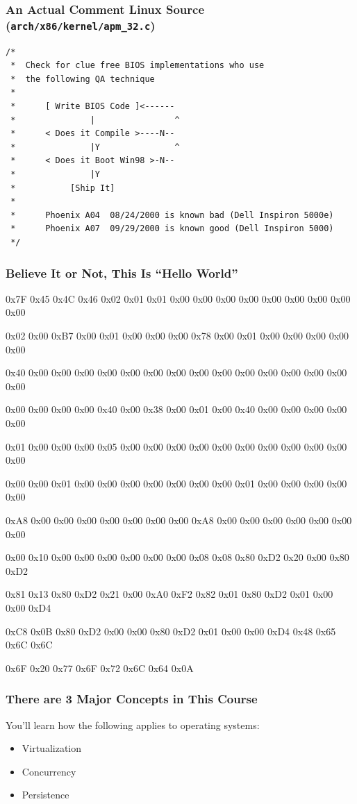   \begin{frame}[fragile]
    \frametitle{An Actual Comment Linux Source (\texttt{arch/x86/kernel/apm\_32.c})}
    \begin{lstlisting}
/*
 *  Check for clue free BIOS implementations who use
 *  the following QA technique
 *
 *      [ Write BIOS Code ]<------
 *               |                ^
 *      < Does it Compile >----N--
 *               |Y               ^
 *      < Does it Boot Win98 >-N--
 *               |Y
 *           [Ship It]
 *
 *      Phoenix A04  08/24/2000 is known bad (Dell Inspiron 5000e)
 *      Phoenix A07  09/29/2000 is known good (Dell Inspiron 5000)
 */
    \end{lstlisting}
  \end{frame}

  \begin{frame}
    \frametitle{Believe It or Not, This Is ``Hello World''}

    \scriptsize \ttfamily
    0x7F 0x45 0x4C 0x46 0x02 0x01 0x01 0x00 0x00 0x00 0x00 0x00 0x00 0x00 0x00
    0x00
    
    0x02 0x00 0xB7 0x00 0x01 0x00 0x00 0x00 0x78 0x00 0x01 0x00 0x00 0x00 0x00
    0x00
    
    0x40 0x00 0x00 0x00 0x00 0x00 0x00 0x00 0x00 0x00 0x00 0x00 0x00 0x00 0x00
    0x00
    
    0x00 0x00 0x00 0x00 0x40 0x00 0x38 0x00 0x01 0x00 0x40 0x00 0x00 0x00 0x00
    0x00
    
    0x01 0x00 0x00 0x00 0x05 0x00 0x00 0x00 0x00 0x00 0x00 0x00 0x00 0x00 0x00
    0x00
    
    0x00 0x00 0x01 0x00 0x00 0x00 0x00 0x00 0x00 0x00 0x01 0x00 0x00 0x00 0x00
    0x00
    
    0xA8 0x00 0x00 0x00 0x00 0x00 0x00 0x00 0xA8 0x00 0x00 0x00 0x00 0x00 0x00
    0x00
    
    0x00 0x10 0x00 0x00 0x00 0x00 0x00 0x00 0x08 0x08 0x80 0xD2 0x20 0x00 0x80
    0xD2
    
    0x81 0x13 0x80 0xD2 0x21 0x00 0xA0 0xF2 0x82 0x01 0x80 0xD2 0x01 0x00 0x00
    0xD4
    
    0xC8 0x0B 0x80 0xD2 0x00 0x00 0x80 0xD2 0x01 0x00 0x00 0xD4 0x48 0x65 0x6C
    0x6C
    
    0x6F 0x20 0x77 0x6F 0x72 0x6C 0x64 0x0A
  \end{frame}

  \begin{frame}
    \frametitle{There are 3 Major Concepts in This Course}

    You'll learn how the following applies to operating systems:
    \begin{itemize}
      \item Virtualization
      \item Concurrency
      \item Persistence
    \end{itemize}
  \end{frame}

